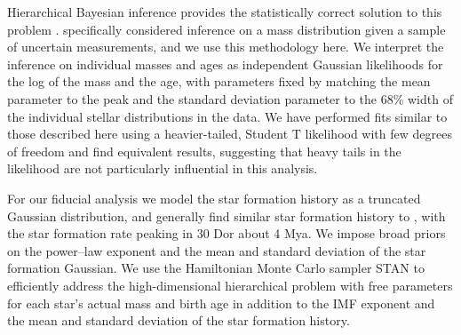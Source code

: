 \documentclass[apjl]{emulateapj}
\begin{document}


Hierarchical Bayesian inference provides the statistically correct solution to
this problem \citep{Hogg:2010}.  \citet{Mandel:2010stat} specifically considered
inference on a mass distribution given a sample of uncertain measurements, and
we use this methodology here.  We interpret the \citet{Schneider:2018} inference
on individual masses and ages as independent Gaussian likelihoods for the log
of the mass and the age, with parameters fixed by matching the mean parameter to the peak and the standard deviation parameter to the 68\% width of the
individual stellar distributions in the \citet{Schneider:2018} data.  We have performed fits similar to those described here using a heavier-tailed, Student T likelihood with few degrees of freedom and find equivalent results, suggesting that heavy tails in the likelihood are not particularly influential in this analysis.

For our fiducial analysis we model the star formation history as a truncated Gaussian distribution, and
generally find similar star formation history to \citet{Schneider:2018}, with
the star formation rate peaking in 30 Dor about 4 Mya.  We impose broad priors
on the power--law exponent and the mean and standard deviation of the star
formation Gaussian.    We use the Hamiltonian Monte Carlo sampler STAN
\citep{STAN} to efficiently address the high-dimensional hierarchical problem
with free parameters for each star's actual mass and birth age in addition to
the IMF exponent and the mean and standard deviation of the star formation
history.
\end{document}

